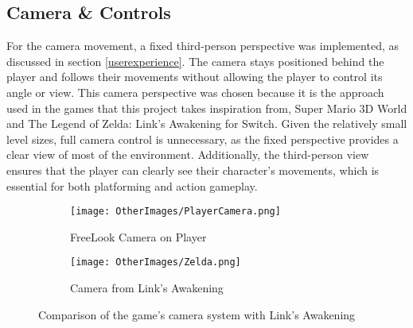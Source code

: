 \documentclass[]{final_report}
\begin{document}
\subsection{Camera \& Controls}
For the camera movement, a fixed third-person perspective was implemented, \color{red} as discussed in section \ref{userexperience}.  The camera stays positioned behind the player and follows their movements without allowing the player to control its angle or view. 
This camera perspective was chosen because it is the approach used in the games that this project takes inspiration from, Super Mario 3D World and The Legend of Zelda: Link’s Awakening for Switch. Given the relatively small level sizes, full camera control is unnecessary, as the fixed perspective provides a clear view of most of the environment. Additionally, the third-person view ensures that the player can clearly see their character’s movements, which is essential for both platforming and action gameplay. \color{black}
\begin{figure}[H]
    \centering
    \begin{subfigure}{0.48\textwidth}
        \centering
        \texttt{[image: OtherImages/PlayerCamera.png]}
        \caption{FreeLook Camera on Player}
        \label{fig:label_camera}
    \end{subfigure}
    \hfill
    \begin{subfigure}{0.48\textwidth}
        \centering
        \texttt{[image: OtherImages/Zelda.png]}
        \caption{Camera from Link's Awakening}
        \label{fig:label_linkcamera}
    \end{subfigure}
    \caption{Comparison of the game's camera system with Link's Awakening}
\end{figure}
\end{document}
